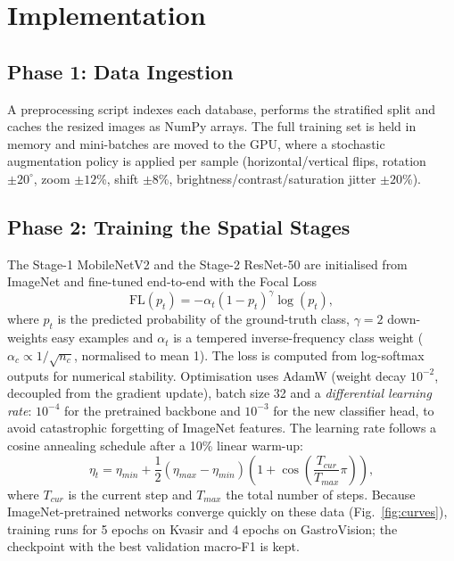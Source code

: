 \documentclass[conference]{IEEEtran}
\begin{document}
\section{Implementation}
\label{sec:implementation}

\subsection{Phase 1: Data Ingestion}
A preprocessing script indexes each database, performs the stratified split and caches the resized images as NumPy
arrays. The full training set is held in memory and mini-batches are moved to the GPU, where a stochastic
augmentation policy is applied per sample (horizontal/vertical flips, rotation $\pm20^\circ$, zoom $\pm12$\%,
shift $\pm8$\%, brightness/contrast/saturation jitter $\pm20$\%).

\subsection{Phase 2: Training the Spatial Stages}
The Stage-1 MobileNetV2 and the Stage-2 ResNet-50 are initialised from ImageNet and fine-tuned end-to-end with the
Focal Loss
\begin{equation}
    \text{FL}(p_t) = -\alpha_t (1 - p_t)^\gamma \log(p_t),
\end{equation}
where $p_t$ is the predicted probability of the ground-truth class, $\gamma=2$ down-weights easy examples and
$\alpha_t$ is a tempered inverse-frequency class weight ($\alpha_c\propto 1/\sqrt{n_c}$, normalised to mean 1). The
loss is computed from log-softmax outputs for numerical stability. Optimisation uses AdamW
\cite{loshchilov2019adamw} (weight decay $10^{-2}$, decoupled from the gradient update), batch size 32 and a
\emph{differential learning rate}: $10^{-4}$ for the pretrained backbone and $10^{-3}$ for the new classifier head, to
avoid catastrophic forgetting of ImageNet features. The learning rate follows a cosine annealing schedule
\cite{loshchilov2017sgdr} after a 10\% linear warm-up:
\begin{equation}
    \eta_t = \eta_{min} + \frac{1}{2}(\eta_{max} - \eta_{min})\left(1 + \cos\left(\frac{T_{cur}}{T_{max}}\pi\right)\right),
\end{equation}
where $T_{cur}$ is the current step and $T_{max}$ the total number of steps. Because ImageNet-pretrained networks
converge quickly on these data (Fig.~\ref{fig:curves}), training runs for 5 epochs on Kvasir and 4 epochs on
GastroVision; the checkpoint with the best validation macro-F1 is kept.
\end{document}
